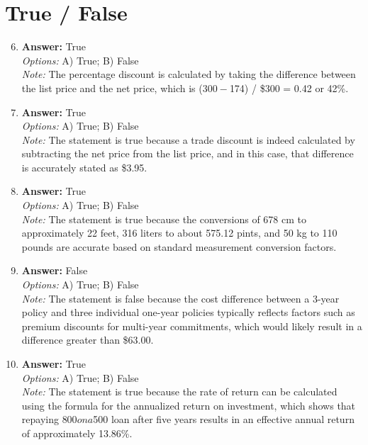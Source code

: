 \documentclass[12pt]{article}
\begin{document}
\section*{True / False}
\begin{enumerate}[label=\arabic*.]
\setcounter{enumi}{5}
\item \textbf{Answer:} True
\\ \textit{Options:} A) True; B) False
\\ \textit{Note:} The percentage discount is calculated by taking the difference between the list price and the net price, which is ($300 - $174) / \$300 = 0.42 or 42\%.
\item \textbf{Answer:} True
\\ \textit{Options:} A) True; B) False
\\ \textit{Note:} The statement is true because a trade discount is indeed calculated by subtracting the net price from the list price, and in this case, that difference is accurately stated as \$3.95.
\item \textbf{Answer:} True
\\ \textit{Options:} A) True; B) False
\\ \textit{Note:} The statement is true because the conversions of 678 cm to approximately 22 feet, 316 liters to about 575.12 pints, and 50 kg to 110 pounds are accurate based on standard measurement conversion factors.
\item \textbf{Answer:} False
\\ \textit{Options:} A) True; B) False
\\ \textit{Note:} The statement is false because the cost difference between a 3-year policy and three individual one-year policies typically reflects factors such as premium discounts for multi-year commitments, which would likely result in a difference greater than \$63.00.
\item \textbf{Answer:} True
\\ \textit{Options:} A) True; B) False
\\ \textit{Note:} The statement is true because the rate of return can be calculated using the formula for the annualized return on investment, which shows that repaying $800 on a $500 loan after five years results in an effective annual return of approximately 13.86\%.
\end{enumerate}
\end{document}

